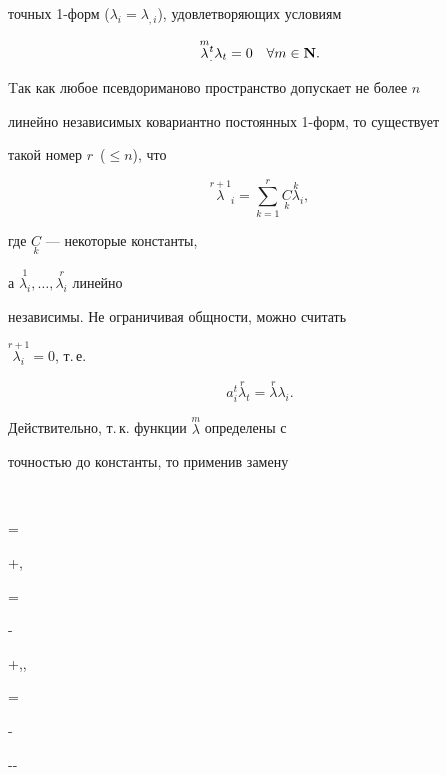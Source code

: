 \begin{pf}
точных 1-форм ($\lambda_i=\lambda_{,i}$), удовлетворяющих условиям


\begin{equation}


\overset{m}{\lambda}{}_.^t \lambda_t=0 \quad \forall m\in \bold N.


\end{equation} 


Tак как любое псевдориманово пространство допускает не более $n$ 


линейно независимых ковариантно постоянных 1-форм, то существует 


такой номер $r$~($\le n$), что


\begin{equation}


\overset{r+1}{\lambda}{}_i=\sum_{k=1}^r


\underset{k}{C}{} \overset{k} {\lambda} {}_i,


\end{equation}


где $\underset{k}{C}$ --- некоторые константы,


а $\overset{1}{\lambda_i}{},\dotsc,\overset{r}{\lambda_i}$ линейно


независимы. Не ограничивая общности, можно считать


$\overset{r+1}{\lambda_i}{}=0$, т.\,е.


\begin{equation}


a_i^t \overset{r} {\lambda}{}_t=\overset{r} {\lambda}{}\lambda_i.


\end{equation} 


Действительно, т.\,к. функции $\overset{m}{\lambda}$ определены с 


точностью до константы, то применив замену


$$


= {\lambda}{}


+,


\quad {}= {\lambda}{}


-  {\lambda}{}


+,\dotsc,


= {\lambda}{}


-


--\dotsb



\end{pf}
